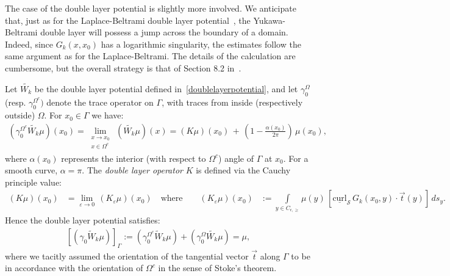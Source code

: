 \documentclass[final]{siamltex}
\renewcommand{\S} {\mathcal{S}}
\begin{document}
The case of the double layer potential is slightly more involved. We
anticipate that, just as for the Laplace-Beltrami double layer
potential~\cite{gemmrich}, the Yukawa-Beltrami double layer will
possess a jump across the boundary of a domain.  Indeed, since
$G_k(x,x_0)$ has a logarithmic singularity, the estimates follow the
same argument as for the Laplace-Beltrami. The details of the
calculation are cumbersome, but the overall strategy is that of Section
8.2 in~\cite{hackbusch}.

\begin{lemma}
\label{l:DLPjump} Let $\widetilde{W_k}$ be the double layer potential defined in~\eqref{doublelayerpotential}, and let $\gamma_0^{\Omega}$ (resp. $\gamma_0^{\Omega^c})$ denote the trace operator on $\Gamma$, with traces from inside (respectively outside) $\Omega$. 
For $x_{0} \in \Gamma$ we have:
\begin{align*} 
  (\gamma^{\Omega^{c}}_0\widetilde{W_k}\mu)(x_0)=
  \lim\limits_{\substack{x \to x_0 \\ x \in \Omega^{c}}}\, 
  (\widetilde{W_k}\mu)(x) =
  (K\mu)(x_0)\,+\,\left(1-\frac{\alpha(x_0)}{2\pi}\right)\,\mu(x_0),
\end{align*}
where $\alpha(x_{0})$ represents the interior (with respect to
$\Omega^{c}$) angle of $\Gamma$ at $x_{0}$. For a smooth curve, $\alpha
= \pi$. The {\it double layer operator} $K$ is defined via the Cauchy principle value: 
\begin{align*}
(K\mu)(x_0)&=\lim_{\varepsilon\rightarrow 0}\, (K_{\varepsilon}\mu)(x_0)
\quad \mbox{where}\qquad
(K_{\varepsilon}\mu)(x_0)&:=\int\limits_{y\in C_{\epsilon,\geq}} 
\mu(y)\,\left[\underline{\mbox{curl}}_{\S}\,
G_k(x_{0},y)\cdot\vec{t}(y)\right]\,ds_{y}.
\end{align*}
Hence the double layer potential satisfies:
\begin{align*}
  \left[(\gamma_0\widetilde W_k\mu) \right]_\Gamma := 
  (\gamma^{\Omega^{c}}_0\widetilde W_k\mu)+(\gamma^{\Omega}_{0} 
  \widetilde{W_k}\mu)=\mu,
\end{align*}
where we tacitly assumed the orientation of the tangential vector
$\vec{t}$ along $\Gamma$ to be in accordance with the orientation of
$\Omega^{c}$ in the sense of Stoke's theorem.

\end{lemma}
\end{document}
